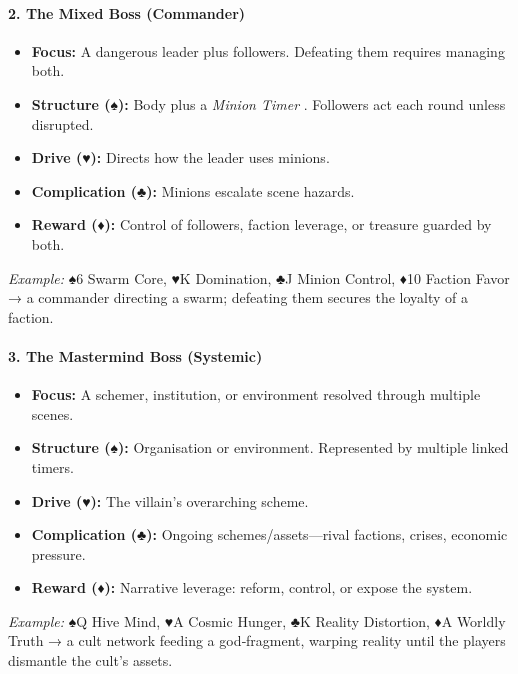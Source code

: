\paragraph{2. The Mixed Boss (Commander)}
\begin{itemize}
    \item \textbf{Focus:} A dangerous leader plus followers. Defeating them requires managing both.
    \item \textbf{Structure (♠):} Body plus a \emph{Minion Timer }. Followers act each round unless disrupted.
    \item \textbf{Drive (♥):} Directs how the leader uses minions.
    \item \textbf{Complication (♣):} Minions escalate scene hazards.
    \item \textbf{Reward (♦):} Control of followers, faction leverage, or treasure guarded by both.
\end{itemize}
\emph{Example:} ♠6 Swarm Core, ♥K Domination, ♣J Minion Control, ♦10 Faction Favor → a commander directing a swarm; defeating them secures the loyalty of a faction.

\paragraph{3. The Mastermind Boss (Systemic)}
\begin{itemize}
    \item \textbf{Focus:} A schemer, institution, or environment resolved through multiple scenes.
    \item \textbf{Structure (♠):} Organisation or environment. Represented by multiple linked timers.
    \item \textbf{Drive (♥):} The villain's overarching scheme.
    \item \textbf{Complication (♣):} Ongoing schemes/assets---rival factions, crises, economic pressure.
    \item \textbf{Reward (♦):} Narrative leverage: reform, control, or expose the system.
\end{itemize}
\emph{Example:} ♠Q Hive Mind, ♥A Cosmic Hunger, ♣K Reality Distortion, ♦A Worldly Truth → a cult network feeding a god‑fragment, warping reality until the players dismantle the cult's assets.

